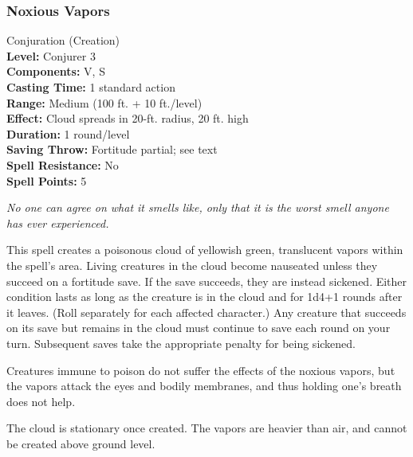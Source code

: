 \subsubsection{Noxious Vapors}
\label{Spell:NoxiousVapors}
Conjuration (Creation)
\\ \textbf{Level:} Conjurer 3
\\ \textbf{Components:} V, S
\\ \textbf{Casting Time:} 1 standard action
\\ \textbf{Range:} Medium (100 ft. + 10 ft./level)
\\ \textbf{Effect:} Cloud spreads in 20-ft. radius, 20 ft. high
\\ \textbf{Duration:} 1 round/level
\\ \textbf{Saving Throw:} Fortitude partial; see text
\\ \textbf{Spell Resistance:} No
\\ \textbf{Spell Points:} 5

\emph{No one can agree on what it smells like, only that it is the worst smell anyone has ever experienced.}

This spell creates a poisonous cloud of yellowish green, translucent vapors within the spell's area.
Living creatures in the cloud become nauseated unless they succeed on a fortitude save.
If the save succeeds, they are instead sickened.
Either condition lasts as long as the creature is in the cloud and for 1d4+1 rounds after it leaves. 
(Roll separately for each affected character.) 
Any creature that succeeds on its save but remains in the cloud must continue to save each round on your turn.
Subsequent saves take the appropriate penalty for being sickened.

Creatures immune to poison do not suffer the effects of the noxious vapors,
but the vapors attack the eyes and bodily membranes, 
and thus holding one's breath does not help.

The cloud is stationary once created. The vapors are heavier than air, and cannot be created above ground level.

